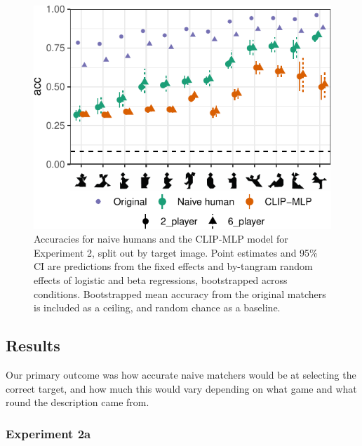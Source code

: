 \documentclass[10pt, letterpaper]{article}
\begin{document}
\begin{CodeChunk}
\begin{figure}[t]

{\centering \includegraphics[width=0.9\linewidth]{figs/fig-2-1} 

}

\caption[Accuracies for naive humans and the CLIP-MLP model for Experiment 2, split out by target image]{Accuracies for naive humans and the CLIP-MLP model for Experiment 2, split out by target image. Point estimates and 95\% CI are predictions from the fixed effects and by-tangram random effects of logistic and beta regressions, bootstrapped across conditions. Bootstrapped mean accuracy from the original matchers is included as a ceiling, and random chance as a baseline. \label{expt2-tangram}}\label{fig:fig-2}
\end{figure}
\end{CodeChunk}

\subsection{Results}\label{results}

Our primary outcome was how accurate naive matchers would be at
selecting the correct target, and how much this would vary depending on
what game and what round the description came from.

\subsubsection{Experiment 2a}\label{experiment-2a-1}
\end{document}
